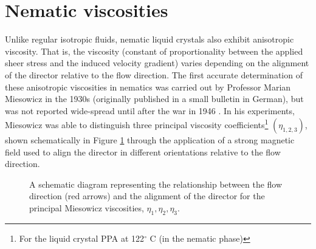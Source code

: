 \section{Nematic viscosities}
Unlike regular isotropic fluids, nematic liquid crystals also exhibit anisotropic viscosity. That is, the viscosity (constant of proportionality between the applied sheer stress and the induced velocity gradient) varies depending on the alignment of the director relative to the flow direction.
The first accurate determination of these anisotropic viscosities in nematics was carried out by Professor Marian Miesowicz in the 1930s (originally published in a small bulletin in German), but was not reported wide-spread until after the war in 1946 \cite{Miesowicz1946}. In his experiments, Miesowicz was able to distinguish three principal viscosity coefficients\footnote{For the liquid crystal PPA at 122$^{\circ}$ C (in the nematic phase)} $\left(\eta_{1,2,3}\right)$, shown schematically in Figure \ref{fig:eta} through the application of a strong magnetic field used to align the director in different orientations relative to the flow direction.

\begin{figure}
\begin{center}
\hspace{0.5cm}
\hspace{0.5cm}
\hspace{0.5cm}
\end{center}
\caption[Schematic depiction of the Miesowicz viscosities, $\eta_1,\eta_2,\eta_3$]{\label{fig:eta}A schematic diagram representing the relationship between the flow direction (red arrows) and the alignment of the director for the principal Miesowicz viscosities, $\eta_1,\eta_2,\eta_3$.}
\end{figure}

